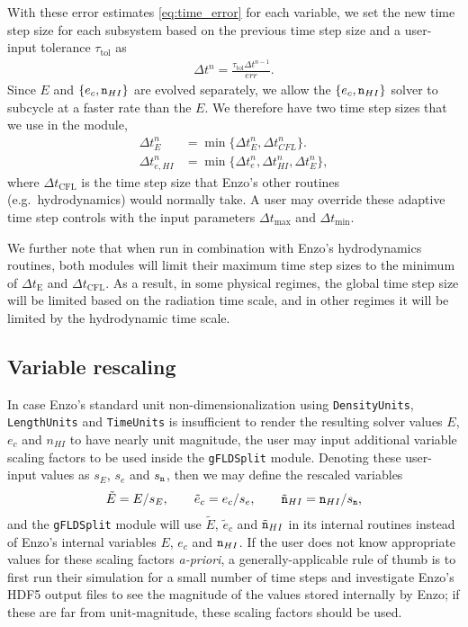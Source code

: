 \documentclass[letterpaper,10pt]{article}
\renewcommand{\(}{\left(}
\renewcommand{\)}{\right)}
\newcommand{\dt}{\Delta t}
\newcommand{\mn}{{\tt n}}
\begin{document}
With these error estimates \eqref{eq:time_error} for each variable, we
set the new time step size for each subsystem based on the previous
time step size and a user-input tolerance $\tau_{\text{tol}}$ as
\begin{align}
\label{eq:time_estimate}
  \dt^{n} = \frac{\tau_{\text{tol}} \dt^{n-1}}{err}.
\end{align}
Since $E$ and $\{e_c,\mn_{HI}\}$ are evolved separately,
we allow the $\{e_c,\mn_{HI}\}$ solver to subcycle at a faster rate
than the $E$.  We therefore have two time step sizes that we use in
the module,
\begin{align}
\label{eq:FLD_time_estimate}
  \dt_{E}^{n} &= \min\{\dt_{E}^{n},\dt_{CFL}^{n}\}. \\
  \dt_{e,HI}^{n} &= \min\{\dt_{e}^{n},\dt_{HI}^{n},\dt_{E}^{n}\},
\end{align}
where $\dt_{\text{CFL}}$ is the time step size that Enzo's other
routines (e.g.~hydrodynamics) would normally take.  A user may
override these adaptive time step controls with the input parameters 
$\dt_{\text{max}}$ and $\dt_{\text{min}}$. 

We further note that when run in combination with Enzo's hydrodynamics
routines, both modules will limit their maximum time step sizes to the
minimum of $\dt_{\text{E}}$ and $\dt_{\text{CFL}}$.  As a result, in
some physical regimes, the global time step size will be limited based
on the radiation time scale, and in other regimes it will be limited
by the hydrodynamic time scale. 




\subsection{Variable rescaling}
\label{sec:variable_rescaling}

In case Enzo's standard unit non-dimensionalization using 
{\tt DensityUnits}, {\tt LengthUnits} and {\tt TimeUnits} is
insufficient to render the resulting solver values $E$, $e_c$ and
$n_{HI}$ to have nearly unit magnitude, the user may input additional
variable scaling factors to be used inside the {\tt gFLDSplit}
module.  Denoting these user-input values as $s_E$, $s_e$ and
$s_{\mn}$, then we may define the rescaled variables
\begin{align}
\label{eq:variable_rescaling}
  \tilde{E} = E / s_E, \qquad \tilde{e}_c = e_c / s_e, \qquad 
  \tilde{\mn}_{HI} = \mn_{HI} / s_{\mn},
\end{align}
and the {\tt gFLDSplit} module will use $\tilde{E}$, $\tilde{e}_c$ and
$\tilde{\mn}_{HI}$ in its internal routines instead of Enzo's internal
variables $E$, $e_c$ and $\mn_{HI}$.  If the user does not know
appropriate values for these scaling factors {\em a-priori}, a
generally-applicable rule of thumb is to first run their simulation
for a small number of time steps and investigate Enzo's HDF5 output
files to see the magnitude of the values stored internally by Enzo; if
these are far from unit-magnitude, these scaling factors should be
used. 
\end{document}

